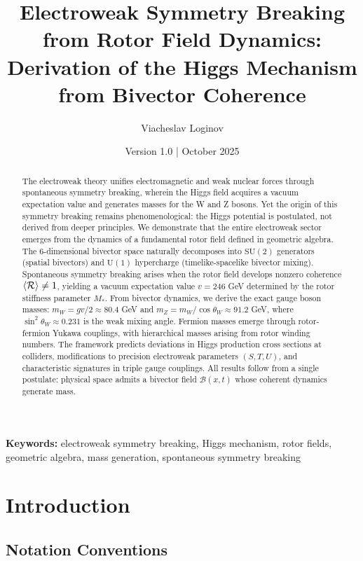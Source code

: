 \documentclass[11pt,a4paper]{article}
\title{\textbf{Electroweak Symmetry Breaking from Rotor Field Dynamics: \\
Derivation of the Higgs Mechanism from Bivector Coherence}}
\author[1]{Viacheslav Loginov}
\affil[1]{Kyiv, Ukraine\\ \texttt{barthez.slavik@gmail.com}}
\date{\small Version 1.0 \quad|\quad 15 October 2025}
\newcommand{\Rotor}{\mathcal{R}}
\newcommand{\Biv}{\mathcal{B}}
\newcommand{\SU}{\mathrm{SU}}
\newcommand{\U}{\mathrm{U}}
\theoremstyle{definition}
\theoremstyle{plain}
\theoremstyle{remark}
\begin{document}
\maketitle

\begin{abstract}
\noindent
The electroweak theory unifies electromagnetic and weak nuclear forces through spontaneous symmetry breaking, wherein the Higgs field acquires a vacuum expectation value and generates masses for the W and Z bosons. Yet the origin of this symmetry breaking remains phenomenological: the Higgs potential is postulated, not derived from deeper principles. We demonstrate that the entire electroweak sector emerges from the dynamics of a fundamental rotor field defined in geometric algebra. The 6-dimensional bivector space naturally decomposes into $\SU(2)$ generators (spatial bivectors) and $\U(1)$ hypercharge (timelike-spacelike bivector mixing). Spontaneous symmetry breaking arises when the rotor field develops nonzero coherence $\ev{\Rotor} \neq 1$, yielding a vacuum expectation value $v = 246$ GeV determined by the rotor stiffness parameter $M_\ast$. From bivector dynamics, we derive the exact gauge boson masses: $m_W = gv/2 \approx 80.4$ GeV and $m_Z = m_W/\cos\theta_W \approx 91.2$ GeV, where $\sin^2\theta_W \approx 0.231$ is the weak mixing angle. Fermion masses emerge through rotor-fermion Yukawa couplings, with hierarchical masses arising from rotor winding numbers. The framework predicts deviations in Higgs production cross sections at colliders, modifications to precision electroweak parameters $(S,T,U)$, and characteristic signatures in triple gauge couplings. All results follow from a single postulate: physical space admits a bivector field $\Biv(x,t)$ whose coherent dynamics generate mass.
\end{abstract}

\noindent\textbf{Keywords:} electroweak symmetry breaking, Higgs mechanism, rotor fields, geometric algebra, mass generation, spontaneous symmetry breaking

\vspace{1em}

\section{Introduction}

\subsection{Notation Conventions}
\end{document}
